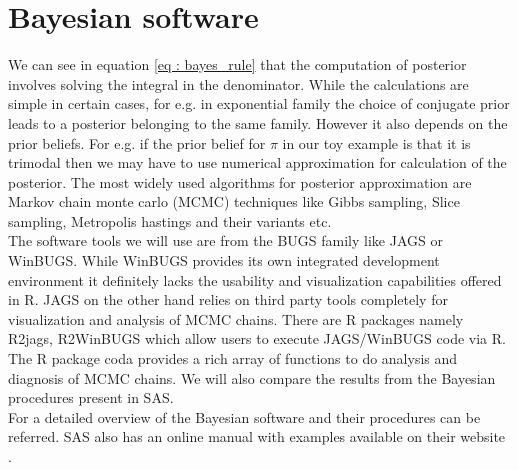 \section{Bayesian software}
We can see in equation \ref{eq : bayes_rule} that the computation of posterior involves solving the integral in the denominator. While the calculations are simple in certain cases, for e.g. in exponential family the choice of conjugate prior leads to a posterior belonging to the same family. However it also depends on the prior beliefs. For e.g. if the prior belief for $\pi$ in our toy example is that it is trimodal then we may have to use numerical approximation for calculation of the posterior. The most widely used algorithms for posterior approximation are Markov chain monte carlo (MCMC) techniques like Gibbs sampling, Slice sampling, Metropolis hastings and their variants etc.\\

The software tools we will use are from the BUGS family like JAGS or WinBUGS. While WinBUGS provides its own integrated development environment it definitely lacks the usability and visualization capabilities offered in R. JAGS on the other hand relies on third party tools completely for visualization and analysis of MCMC chains. There are R packages namely R2jags, R2WinBUGS which allow users to execute JAGS/WinBUGS code via R. The R package coda provides a rich array of functions to do analysis and diagnosis of MCMC chains. We will also compare the results from the Bayesian procedures present in SAS.\\

For a detailed overview of the Bayesian software and their procedures \citet[Chap. 8]{lesaffre_bayesian_2012} can be referred. SAS also has an online manual with examples available on their website \cite{_bayesian_????}.